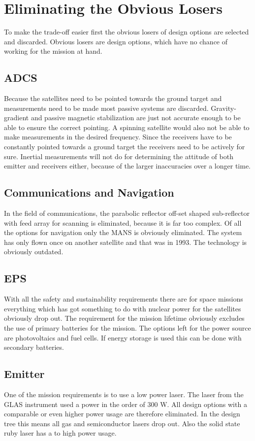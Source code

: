 \section{Eliminating the Obvious Losers}
To make the trade-off easier first the obvious losers of design options are selected and discarded. Obvious losers are design options, which have no chance of working for the mission at hand.

\subsection{\ac{ADCS}}
Because the satellites need to be pointed towards the ground target and measurements need to be made most passive systems are discarded. Gravity-gradient and passive magnetic stabilization are just not accurate enough to be able to ensure the correct pointing. A spinning satellite would also not be able to make measurements in the desired frequency. Since the receivers have to be constantly pointed towards a ground target the receivers need to be actively for sure. Inertial measurements will not do for determining the attitude of both emitter and receivers either, because of the larger inaccuracies over a longer time.

\subsection{Communications and Navigation}
In the field of communications, the parabolic reflector off-set shaped sub-reflector with feed array for scanning is eliminated, because it is far too complex.
Of all the options for navigation only the \ac{MANS} is obviously eliminated. The system has only flown once on another satellite and that was in 1993. The technology is obviously outdated.

\subsection{\ac{EPS}}
With all the safety and sustainability requirements there are for space missions everything which has got something to do with nuclear power for the satellites obviously drop out. The requirement for the mission lifetime obviously excludes the use of primary batteries for the mission. The options left for the power source are photovoltaics and fuel cells. If energy storage is used this can be done with secondary batteries.

\subsection{Emitter}
One of the mission requirements is to use a low power laser. The laser from the \ac{GLAS} instrument used a power in the order of 300 W. All design options with a comparable or even higher power usage are therefore eliminated. In the design tree this means all gas and semiconductor lasers drop out. Also the solid state ruby laser has a to high power usage.

